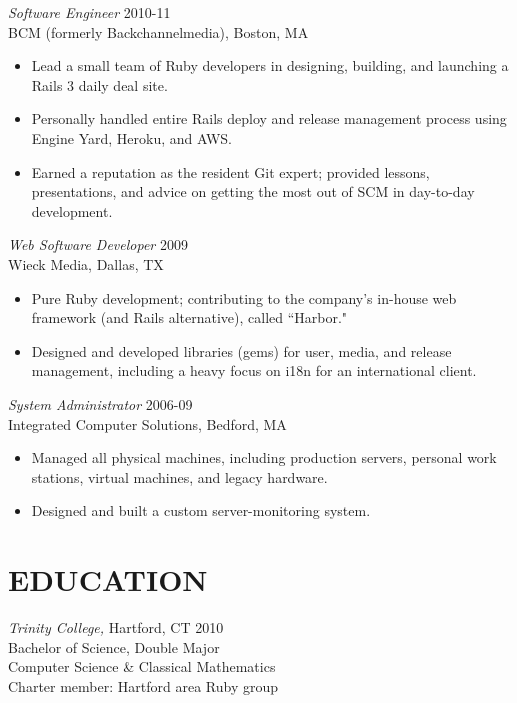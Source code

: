 \documentclass[line,margin]{res}
\begin{document}
\begin{resume}
  {\sl Software Engineer}  \hfill 2010-11 \\
  BCM (formerly Backchannelmedia),
  Boston, MA
  \begin{itemize}  \itemsep -2pt %
    \item Lead a small team of Ruby developers in designing, building, and launching a Rails 3 daily deal site.
    \item Personally handled entire Rails deploy and release management process using Engine Yard, Heroku, and AWS.
    \item Earned a reputation as the resident Git expert; provided lessons, presentations, and advice on getting the most out of SCM in day-to-day development.
  \end{itemize}

  {\sl Web Software Developer}  \hfill 2009 \\
  Wieck Media,
  Dallas, TX
  \begin{itemize}  \itemsep -2pt %
    \item Pure Ruby development; contributing to the company's in-house web framework (and Rails alternative), called ``Harbor."
    \item Designed and developed libraries (gems) for user, media, and release management, including a heavy focus on i18n for an international client.
  \end{itemize}

  {\sl System Administrator}  \hfill 2006-09 \\
  Integrated Computer Solutions,
  Bedford, MA
  \begin{itemize}  \itemsep -2pt %
       \item Managed all physical machines, including production servers, personal work stations, virtual machines, and legacy hardware.
       \item Designed and built a custom server-monitoring system.
  \end{itemize}

\section{EDUCATION}
  {\sl Trinity College,}
  Hartford, CT \hfill 2010 \\
  Bachelor of Science, Double Major \\
  Computer Science \& Classical Mathematics \\
  Charter member: Hartford area Ruby group


\end{resume}
\end{document}
